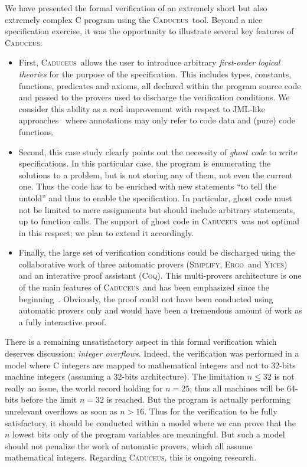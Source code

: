\documentclass[a4paper]{llncs}
\newcommand{\caduceus}{\textsc{Caduceus}}
\newcommand{\simplify}{\textsc{Simplify}}
\newcommand{\ergo}{\textsc{Ergo}}
\newcommand{\yices}{\textsc{Yices}}
\newcommand{\coq}{\textsc{Coq}}
\begin{document}
We have presented the formal verification of an extremely short but
also extremely complex C program using the \caduceus\ tool. Beyond a
nice specification exercise, it was the opportunity to illustrate
several key features of \caduceus:
\begin{itemize}
\item 
  First, \caduceus\ allows the user to introduce arbitrary
  \emph{first-order logical theories} for the purpose of the
  specification. This includes types, constants, functions, predicates
  and axioms, all declared within the program source code and passed
  to the provers used to discharge the verification conditions.
  We consider this ability as a real improvement with respect to
  JML-like approaches~\cite{JML} where annotations may only refer to code data
  and (pure) code functions. 

\item 
  Second, this case study clearly points out the necessity of
  \emph{ghost code} to write specifications. In this particular case,
  the program is enumerating the solutions to a problem, but is not
  storing any of them, not even the current one. Thus the code has to
  be enriched with new statements ``to tell the untold'' and thus to
  enable the specification. In particular, ghost code must not be
  limited to mere assignments but should include arbitrary statements,
  up to function calls. The support of ghost code in \caduceus\ was
  not optimal in this respect; we plan to extend it accordingly.

\item 
  Finally, the large set of verification conditions could be
  discharged using the collaborative work of three automatic provers
  (\simplify, \ergo\ and \yices) and an interative proof assistant
  (\coq). This multi-provers architecture is one of the main features
  of \caduceus\ and has been emphasized since the
  beginning~\cite{FilliatreMarche04}. Obviously, the proof could not
  have been conducted using automatic provers only and would have been
  a tremendous amount of work as a fully interactive proof.
\end{itemize}

There is a remaining unsatisfactory aspect in this formal
verification which deserves discussion: \emph{integer
overflows}. Indeed, the verification was performed in a model where C
integers are mapped to mathematical integers and not to 32-bits
machine integers (assuming a 32-bits architecture). The limitation
$n\le 32$ is not really an issue, the world record holding for $n=25$;
thus all machines will be 64-bits before the limit $n=32$ is reached.
But the program is actually performing unrelevant overflows as soon as
$n>16$. Thus for the verification to be fully satisfactory, it should
be conducted within a model where we can prove that the $n$ lowest
bits only of the program variables are meaningful. But such a model
should not penalize the work of automatic provers, which all assume
mathematical integers. Regarding \caduceus, this is ongoing research.
\end{document}
